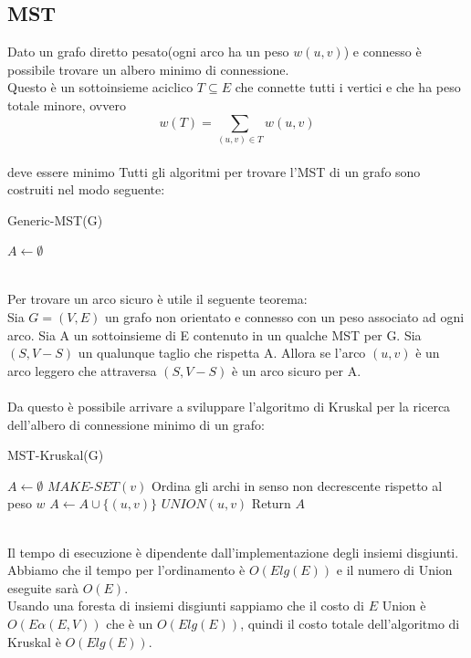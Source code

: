 \documentclass[]{article}
\begin{document}
\subsection{MST}
Dato un grafo diretto pesato(ogni arco ha un peso $w(u,v)$) e connesso è possibile trovare un albero minimo di connessione.\\
Questo è un sottoinsieme aciclico $T\subseteq E$ che connette tutti i vertici e che ha peso totale minore, ovvero\\
$$w(T) = \sum_{(u,v)\in T} w(u,v)$$ \\
deve essere minimo
Tutti gli algoritmi per trovare l'MST di un grafo sono costruiti nel modo seguente:
\begin{algorithm}
\caption{Generic-MST(G)}
\begin{algorithmic}[1]
\STATE $A \leftarrow \emptyset$
\ENDWHILE
\end{algorithmic}
\end{algorithm}
\\
Per trovare un arco sicuro è utile il seguente teorema:\\
Sia $G=(V,E)$ un grafo non orientato e connesso con un peso associato ad ogni arco. Sia A un sottoinsieme di E contenuto in un qualche MST per G. Sia $(S, V-S)$ un qualunque taglio che rispetta A. Allora se l'arco $(u,v)$ è un arco leggero che attraversa $(S, V-S)$ è un arco sicuro per A.\\\\
Da questo è possibile arrivare a sviluppare l'algoritmo di Kruskal per la ricerca dell'albero di connessione minimo di un grafo:
\begin{algorithm}
\caption{MST-Kruskal(G)}
\begin{algorithmic}[1]
\STATE $A \leftarrow \emptyset$
	\STATE $MAKE\mbox{-}SET(v)$
\ENDFOR 
\STATE Ordina gli archi in senso non decrescente rispetto al peso $w$
		\STATE $A \leftarrow A \cup \{(u,v)\}$
		\STATE $UNION(u,v)$	
	\ENDIF
\ENDFOR
\STATE Return $A$
\end{algorithmic}
\end{algorithm}
\\
Il tempo di esecuzione è dipendente dall'implementazione degli insiemi disgiunti.\\
Abbiamo che il tempo per l'ordinamento è $O(Elg(E))$ e il numero di Union eseguite sarà $O(E)$.\\
Usando una foresta di insiemi disgiunti sappiamo che il costo di $E$ Union è $O(E\alpha(E,V))$ che è un $O(Elg(E))$, quindi il costo totale dell'algoritmo di Kruskal è $O(Elg(E))$.
\end{document}
